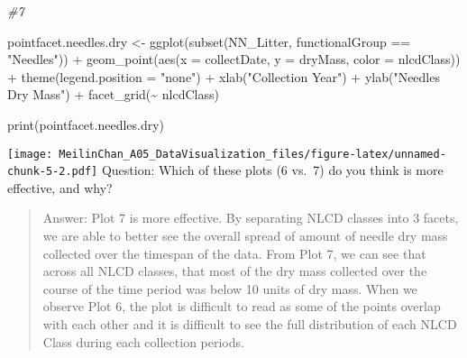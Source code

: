 \documentclass[
]{article}
\newenvironment{Shaded}{\begin{snugshade}}{\end{snugshade}}
\newcommand{\AttributeTok}[1]{\textcolor[rgb]{0.77,0.63,0.00}{#1}}
\newcommand{\CommentTok}[1]{\textcolor[rgb]{0.56,0.35,0.01}{\textit{#1}}}
\newcommand{\FunctionTok}[1]{\textcolor[rgb]{0.00,0.00,0.00}{#1}}
\newcommand{\NormalTok}[1]{#1}
\newcommand{\OtherTok}[1]{\textcolor[rgb]{0.56,0.35,0.01}{#1}}
\newcommand{\SpecialCharTok}[1]{\textcolor[rgb]{0.00,0.00,0.00}{#1}}
\newcommand{\StringTok}[1]{\textcolor[rgb]{0.31,0.60,0.02}{#1}}
\begin{document}
\begin{Shaded}
\begin{Highlighting}[]
\CommentTok{\#7}

\NormalTok{pointfacet.needles.dry }\OtherTok{\textless{}{-}} \FunctionTok{ggplot}\NormalTok{(}\FunctionTok{subset}\NormalTok{(NN\_Litter, functionalGroup }\SpecialCharTok{==} \StringTok{"Needles"}\NormalTok{)) }\SpecialCharTok{+}
  \FunctionTok{geom\_point}\NormalTok{(}\FunctionTok{aes}\NormalTok{(}\AttributeTok{x =}\NormalTok{ collectDate, }\AttributeTok{y =}\NormalTok{ dryMass, }\AttributeTok{color =}\NormalTok{ nlcdClass)) }\SpecialCharTok{+}
  \FunctionTok{theme}\NormalTok{(}\AttributeTok{legend.position =} \StringTok{"none"}\NormalTok{) }\SpecialCharTok{+}
  \FunctionTok{xlab}\NormalTok{(}\StringTok{"Collection Year"}\NormalTok{) }\SpecialCharTok{+}
  \FunctionTok{ylab}\NormalTok{(}\StringTok{"Needles Dry Mass"}\NormalTok{) }\SpecialCharTok{+}
  \FunctionTok{facet\_grid}\NormalTok{(}\SpecialCharTok{\textasciitilde{}}\NormalTok{ nlcdClass)}

\FunctionTok{print}\NormalTok{(pointfacet.needles.dry)}
\end{Highlighting}
\end{Shaded}

\texttt{[image: MeilinChan\_A05\_DataVisualization\_files/figure-latex/unnamed-chunk-5-2.pdf]}
Question: Which of these plots (6 vs.~7) do you think is more effective,
and why?

\begin{quote}
Answer: Plot 7 is more effective. By separating NLCD classes into 3
facets, we are able to better see the overall spread of amount of needle
dry mass collected over the timespan of the data. From Plot 7, we can
see that across all NLCD classes, that most of the dry mass collected
over the course of the time period was below 10 units of dry mass. When
we observe Plot 6, the plot is difficult to read as some of the points
overlap with each other and it is difficult to see the full distribution
of each NLCD Class during each collection periods.
\end{quote}
\end{document}

